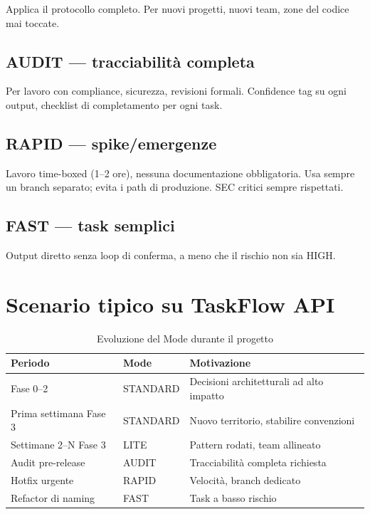 Applica il protocollo completo. Per nuovi progetti, nuovi team, zone del codice mai toccate.

\subsection*{AUDIT --- tracciabilità completa}

Per lavoro con compliance, sicurezza, revisioni formali. Confidence tag su ogni output, checklist di completamento per ogni task.

\subsection*{RAPID --- spike/emergenze}

Lavoro time-boxed (1--2 ore), nessuna documentazione obbligatoria. Usa sempre un branch separato; evita i path di produzione. SEC critici sempre rispettati.

\subsection*{FAST --- task semplici}

Output diretto senza loop di conferma, a meno che il rischio non sia HIGH.

\section{Scenario tipico su TaskFlow API}
\label{sec:06-scenario}

\begin{table}[htbp]
  \centering
  \begin{tabular}{lll}
    \toprule
    \textbf{Periodo} & \textbf{Mode} & \textbf{Motivazione} \\
    \midrule
    Fase 0--2 & STANDARD & Decisioni architetturali ad alto impatto \\
    Prima settimana Fase 3 & STANDARD & Nuovo territorio, stabilire convenzioni \\
    Settimane 2--N Fase 3 & LITE & Pattern rodati, team allineato \\
    Audit pre-release & AUDIT & Tracciabilità completa richiesta \\
    Hotfix urgente & RAPID & Velocità, branch dedicato \\
    Refactor di naming & FAST & Task a basso rischio \\
    \bottomrule
  \end{tabular}
  \caption{Evoluzione del Mode durante il progetto}
  \label{tab:06-scenario}
\end{table}

